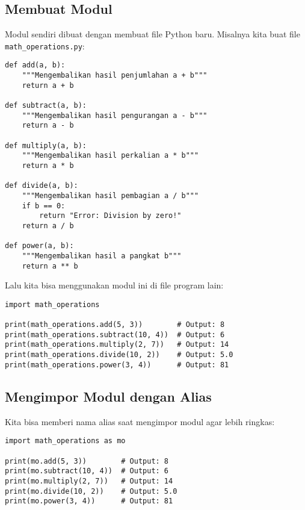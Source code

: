 \subsection{Membuat Modul}

Modul sendiri dibuat dengan membuat file Python baru. Misalnya kita buat file \texttt{math_operations.py}:

\begin{lstlisting}[style=PythonStyle, caption={Kode Python: math_operations.py}]
def add(a, b):
    """Mengembalikan hasil penjumlahan a + b"""
    return a + b

def subtract(a, b):
    """Mengembalikan hasil pengurangan a - b"""
    return a - b

def multiply(a, b):
    """Mengembalikan hasil perkalian a * b"""
    return a * b

def divide(a, b):
    """Mengembalikan hasil pembagian a / b"""
    if b == 0:
        return "Error: Division by zero!"
    return a / b

def power(a, b):
    """Mengembalikan hasil a pangkat b"""
    return a ** b
\end{lstlisting}

Lalu kita bisa menggunakan modul ini di file program lain:

\begin{lstlisting}[style=PythonStyle, caption={Kode Python: calculator.py}]
import math_operations

print(math_operations.add(5, 3))        # Output: 8
print(math_operations.subtract(10, 4))  # Output: 6
print(math_operations.multiply(2, 7))   # Output: 14
print(math_operations.divide(10, 2))    # Output: 5.0
print(math_operations.power(3, 4))      # Output: 81
\end{lstlisting}

\subsection{Mengimpor Modul dengan Alias}

Kita bisa memberi nama alias saat mengimpor modul agar lebih ringkas:

\begin{lstlisting}[style=PythonStyle, caption={Kode Python: calculator.py}]
import math_operations as mo

print(mo.add(5, 3))        # Output: 8
print(mo.subtract(10, 4))  # Output: 6
print(mo.multiply(2, 7))   # Output: 14
print(mo.divide(10, 2))    # Output: 5.0
print(mo.power(3, 4))      # Output: 81
\end{lstlisting}

